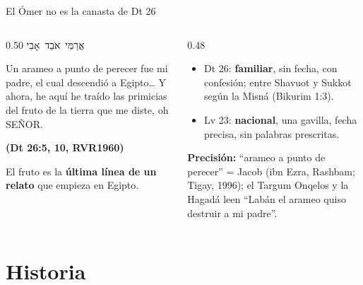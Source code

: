 \documentclass[hyperref={bookmarks=false},aspectratio=169]{beamer}
\newcommand{\heb}[1]{\mbox{\foreignlanguage{hebrew}{#1}}}
\newcommand{\SENOR}{S{\fontsize{0.78em}{1em}\selectfont EÑOR}}
\newcommand{\fuente}[1]{\par\hfill{\upshape\bfseries\footnotesize\textcolor{tierraroja}{#1}}}
\newcommand{\destacar}[1]{\textbf{\textcolor{tierraroja}{#1}}}
\newcommand{\precision}[1]{{\footnotesize\color{sepia}\textbf{Precisión:} #1}}
\begin{document}
\begin{frame}{El Ómer no es la canasta de Dt 26}
\begin{columns}[t,onlytextwidth]
\begin{column}{0.50\textwidth}
\centering\heb{אֲרַמִּי אֹבֵד אָבִי}
\begin{cita}Un arameo a punto de perecer fue mi padre, el cual descendió a Egipto\ldots{} Y ahora, he aquí he traído las primicias del fruto de la tierra que me diste, oh \SENOR.\fuente{(Dt 26:5, 10, RVR1960)}\end{cita}
\scriptsize\RaggedRight El fruto es la \destacar{última línea de un relato} que empieza en Egipto.
\end{column}
\begin{column}{0.48\textwidth}\small\RaggedRight
\begin{itemize}
\item Dt 26: \destacar{familiar}, sin fecha, con confesión; entre Shavuot y Sukkot según la Misná (Bikurim 1:3).
\item Lv 23: \destacar{nacional}, una gavilla, fecha precisa, sin palabras prescritas.
\end{itemize}
\precision{``arameo a punto de perecer'' = Jacob (ibn Ezra, Rashbam; Tigay, 1996); el Targum Onqelos y la Hagadá leen ``Labán el arameo quiso destruir a mi padre''.}
\end{column}
\end{columns}
\end{frame}

\section{Historia}
\end{document}
